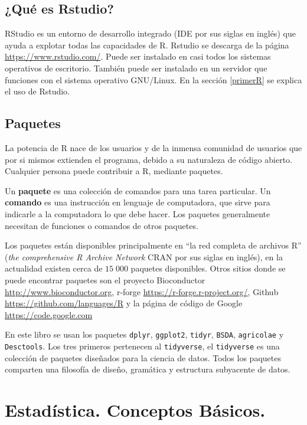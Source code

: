 \documentclass[
]{krantz}
\begin{document}
\hypertarget{que-es-rstudio}{%
\section{¿Qué es Rstudio?}\label{que-es-rstudio}}

RStudio es un entorno de desarrollo integrado (IDE por sus siglas en inglés) que ayuda a explotar todas las capacidades de R. Rstudio se descarga de la página \url{https://www.rstudio.com/}. Puede ser instalado en casi todos los sistemas operativos de escritorio. También puede ser instalado en un servidor que funciones con el sistema operativo GNU/Linux. En la sección \ref{primerR} se explica el uso de Rstudio.

\hypertarget{packages}{%
\section{Paquetes}\label{packages}}

La potencia de R nace de los usuarios y de la inmensa comunidad de usuarios que por si mismos extienden el programa, debido a su naturaleza de código abierto. Cualquier persona puede contribuir a R, mediante paquetes.

Un \textbf{paquete} es una colección de comandos para una tarea particular. Un \textbf{comando} es una instrucción en lenguaje de computadora, que sirve para indicarle a la computadora lo que debe hacer. Los paquetes generalmente necesitan de funciones o comandos de otros paquetes.

Los paquetes están disponibles principalmente en ``la red completa de archivos R'' (\emph{the comprehensive R Archive Network} CRAN por sus siglas en inglés), en la actualidad existen cerca de \(15\;000\) paquetes disponibles. Otros sitios donde se puede encontrar paquetes son el proyecto Bioconductor \url{http://www.bioconductor.org}, r-forge \url{https://r-forge.r-project.org/}, Github \url{https://github.com/languages/R} y la página de código de Google \url{https://code.google.com}

En este libro se usan los paquetes \texttt{dplyr}, \texttt{ggplot2}, \texttt{tidyr}, \texttt{BSDA}, \texttt{agricolae} y \texttt{Desctools}. Los tres primeros pertenecen al \texttt{tidyverse}, el \texttt{tidyverse} es una colección de paquetes diseñados para la ciencia de datos. Todos los paquetes comparten una filosofía de diseño, gramática y estructura subyacente de datos.

\hypertarget{intro}{%
\chapter{Estadística. Conceptos Básicos.}\label{intro}}
\end{document}
